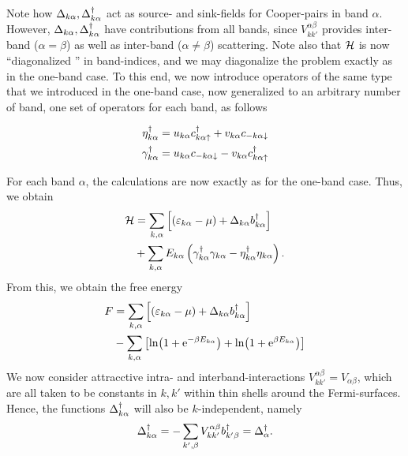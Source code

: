 Note how $\Delta_{k\alpha}, \Delta_{k\alpha}^{\dagger}$ act as source- and sink-fields for Cooper-pairs in band $\alpha$. However,  $\Delta_{k\alpha}, \Delta_{k\alpha}^{\dagger}$ have contributions from all bands, since $V_{kk'}^{\alpha\beta}$ provides inter-band ($\alpha = \beta$) as well as inter-band ($\alpha\ne\beta$) scattering. Note also that $\mathcal{H}$ is now ``diagonalized '' in band-indices, and we may diagonalize the problem exactly as in the one-band case. 
{To this end, we now introduce operators of the same type that we introduced in the one-band case, now generalized to an arbitrary number of band, one set of operators for each band, as follows}
\begin{tcolorbox}
	\begin{equation}
		\begin{aligned}
			\eta_{k\alpha}^{\dagger} &= u_{k\alpha}c^{\dagger}_{k\alpha\uparrow} + v_{k\alpha}c_{-k\alpha\downarrow} \\
			\gamma_{k\alpha}^{\dagger} &= u_{k\alpha}c_{-k\alpha\downarrow} -v_{k\alpha} c^{\dagger}_{k\alpha\uparrow}
		\end{aligned}
	\end{equation}
\end{tcolorbox}
For each band $\alpha$, the calculations are now exactly as for the one-band case. Thus, we obtain
\begin{equation}
	\begin{aligned}
	\mathcal{H} &= \sum_{k,\alpha}\left [(\varepsilon_{k\alpha}-\mu) + \Delta_{k\alpha}b_{k\alpha}^{\dagger}\right ] \\& + 
	\sum_{k,\alpha}E_{k\alpha}\left (\gamma_{k\alpha}^{\dagger}\gamma_{k\alpha} - \eta_{k\alpha}^{\dagger}\eta_{k\alpha}\right ).
	\end{aligned}
\end{equation}
From this, we obtain the free energy
\begin{equation}
	\begin{aligned}
		F &= \sum_{k,\alpha}\left [(\varepsilon_{k\alpha}-\mu)+ \Delta_{k\alpha}b_{k\alpha}^{\dagger}\right ]  \\
		&-\sum_{k,\alpha}\left [\ln(1+\mathrm{e}^{-\beta E_{k\alpha}}) +\ln(1 + \mathrm{e}^{\beta E_{k\alpha}})\right ]
	\end{aligned}
\end{equation}
We now consider attracctive intra- and interband-interactions
$V_{kk'}^{\alpha\beta} = V_{\alpha\beta}$, which are all taken to be constants in $k,k'$ within thin shells around the Fermi-surfaces. Hence, the functions $\Delta_{k\alpha}^{\dagger}$ will also be $k$-independent, namely
\begin{equation}
	\Delta_{k\alpha}^{\dagger} = -\sum_{k',\beta}V_{kk'}^{\alpha\beta}b_{k'\beta}^{\dagger} = \Delta_{\alpha}^{\dagger}.
\end{equation}
